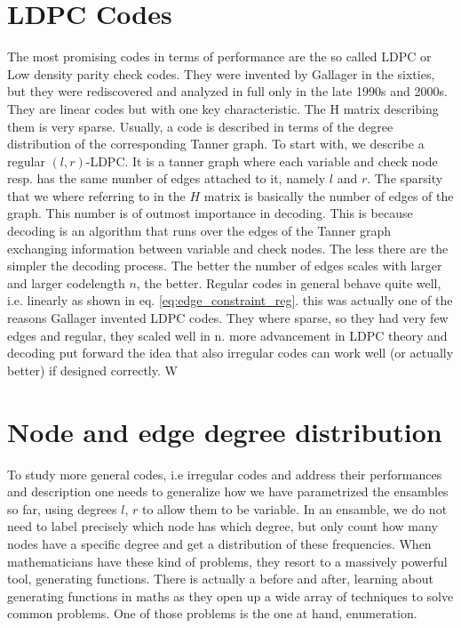 \section{LDPC Codes}
The most promising codes in terms of performance are the so called LDPC or Low density parity check codes. They were invented by Gallager in the sixties, but they were rediscovered and analyzed in full only in the late 1990s and 2000s. They are linear codes but with one key characteristic. The H matrix describing them is very sparse. Usually, a code is described in terms of the degree distribution of the corresponding Tanner graph. To start with, we describe a regular $(l,r)$-LDPC. It is a tanner graph where each variable and check node resp. has the same number of edges attached to it, namely $l$ and $r$. The sparsity that we where referring to in the $H$ matrix is basically the number of edges of the graph. This number is of outmost importance in decoding. This is because decoding is an algorithm that runs over the edges of the Tanner graph exchanging information between variable and check nodes. The less there are the simpler the decoding process. The better the number of edges scales with larger and larger codelength $n$, the better. Regular codes in general behave quite well, i.e. linearly as shown in eq. \ref{eq:edge_constraint_reg}. this was actually one of the reasons Gallager invented LDPC codes. They where sparse, so they had very few edges and regular, they scaled well in n. more advancement in LDPC theory and decoding put forward the idea that also irregular codes can work well (or actually better) if designed correctly. W

\section{Node and edge degree distribution}
To study more general codes, i.e irregular codes and address their performances and description one needs to generalize how we have parametrized the ensambles so far, using degrees $l$, $r$ to allow them to be variable. In an ensamble, we do not need to label precisely which node has which degree, but only count how many nodes have a specific degree and get a distribution of these frequencies. When mathematicians have these kind of problems, they resort to a massively powerful tool, generating functions. There is actually a before and after, learning about generating functions in maths as they open up a wide array of techniques to solve common problems. One of those problems is the one at hand, enumeration.

